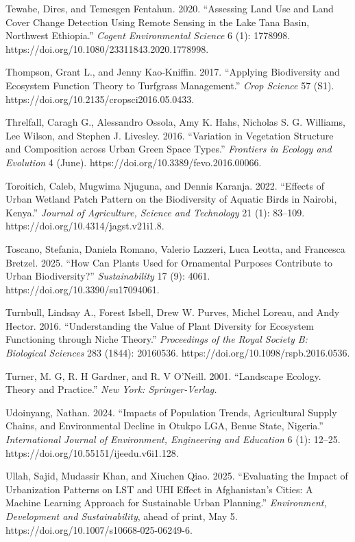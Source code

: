Tewabe, Dires, and Temesgen Fentahun. 2020. ``Assessing Land Use and Land Cover Change Detection Using Remote Sensing in the Lake Tana Basin, Northwest Ethiopia.'' \emph{Cogent Environmental Science} 6 (1): 1778998. https://doi.org/10.1080/23311843.2020.1778998.

Thompson, Grant L., and Jenny Kao‐Kniffin. 2017. ``Applying Biodiversity and Ecosystem Function Theory to Turfgrass Management.'' \emph{Crop Science} 57 (S1). https://doi.org/10.2135/cropsci2016.05.0433.

Threlfall, Caragh G., Alessandro Ossola, Amy K. Hahs, Nicholas S. G. Williams, Lee Wilson, and Stephen J. Livesley. 2016. ``Variation in Vegetation Structure and Composition across Urban Green Space Types.'' \emph{Frontiers in Ecology and Evolution} 4 (June). https://doi.org/10.3389/fevo.2016.00066.

Toroitich, Caleb, Mugwima Njuguna, and Dennis Karanja. 2022. ``Effects of Urban Wetland Patch Pattern on the Biodiversity of Aquatic Birds in Nairobi, Kenya.'' \emph{Journal of Agriculture, Science and Technology} 21 (1): 83--109. https://doi.org/10.4314/jagst.v21i1.8.

Toscano, Stefania, Daniela Romano, Valerio Lazzeri, Luca Leotta, and Francesca Bretzel. 2025. ``How Can Plants Used for Ornamental Purposes Contribute to Urban Biodiversity?'' \emph{Sustainability} 17 (9): 4061. https://doi.org/10.3390/su17094061.

Turnbull, Lindsay A., Forest Isbell, Drew W. Purves, Michel Loreau, and Andy Hector. 2016. ``Understanding the Value of Plant Diversity for Ecosystem Functioning through Niche Theory.'' \emph{Proceedings of the Royal Society B: Biological Sciences} 283 (1844): 20160536. https://doi.org/10.1098/rspb.2016.0536.

Turner, M. G, R. H Gardner, and R. V O'Neill. 2001. ``Landscape Ecology. Theory and Practice.'' \emph{New York: Springer-Verlag.}

Udoinyang, Nathan. 2024. ``Impacts of Population Trends, Agricultural Supply Chains, and Environmental Decline in Otukpo LGA, Benue State, Nigeria.'' \emph{International Journal of Environment, Engineering and Education} 6 (1): 12--25. https://doi.org/10.55151/ijeedu.v6i1.128.

Ullah, Sajid, Mudassir Khan, and Xiuchen Qiao. 2025. ``Evaluating the Impact of Urbanization Patterns on LST and UHI Effect in Afghanistan's Cities: A Machine Learning Approach for Sustainable Urban Planning.'' \emph{Environment, Development and Sustainability}, ahead of print, May 5. https://doi.org/10.1007/s10668-025-06249-6.

